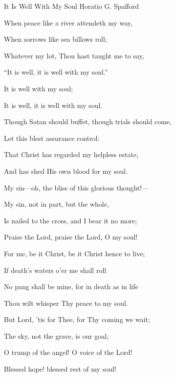 \documentclass[12pt]{book}
\begin{document}
\begin{song}{It Is Well With My Soul}{}
  {\SBPubDom}
  {Horatio G. Spafford}
  {}
  {}

  \begin{SBVerse}
    When peace like a river attendeth my way,

    When sorrows like sea billows roll;

    Whatever my lot, Thou hast taught me to say,

    ``It is well, it is well with my soul.''
  \end{SBVerse}

  \begin{SBOpGroup}
    It is well with my soul;

    It is well, it is well with my soul.
  \end{SBOpGroup}

  \begin{SBVerse}
    Though Satan should buffet, though trials should come,

    Let this blest assurance control:

    That Christ has regarded my helpless estate,

    And has shed His own blood for my soul.
  \end{SBVerse}

  \begin{SBVerse}
    My sin---oh, the bliss of this glorious thought!---

    My sin, not in part, but the whole,

    Is nailed to the cross, and I bear it no more;

    Praise the Lord, praise the Lord, O my soul!
  \end{SBVerse}

  \begin{SBVerse}
    For me, be it Christ, be it Christ hence to live;

    If death's waters o'er me shall roll

    No pang shall be mine, for in death as in life

    Thou wilt whisper Thy peace to my soul.
  \end{SBVerse}

  \begin{SBVerse}
    But Lord, 'tis for Thee, for Thy coming we wait;

    The sky, not the grave, is our goal;

    O trump of the angel! O voice of the Lord!

    Blessed hope! blessed rest of my soul!
  \end{SBVerse}
\end{song}
\end{document}
